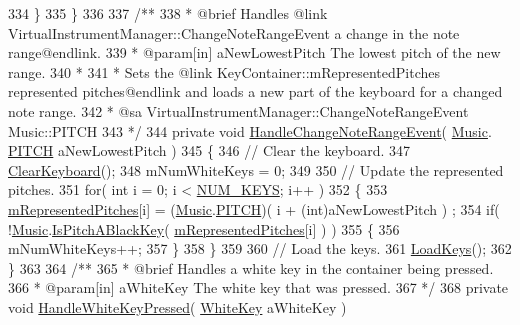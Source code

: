 \begin{DoxyCodeInclude}
334         \}
335     \}
336 \textcolor{comment}{}
337 \textcolor{comment}{    /** }
338 \textcolor{comment}{     * @brief Handles @link VirtualInstrumentManager::ChangeNoteRangeEvent a change in the note
       range@endlink.}
339 \textcolor{comment}{     * @param[in] aNewLowestPitch The lowest pitch of the new range.}
340 \textcolor{comment}{     * }
341 \textcolor{comment}{     * Sets the @link KeyContainer::mRepresentedPitches represented pitches@endlink and loads a new part of
       the keyboard for a changed note range.}
342 \textcolor{comment}{     * @sa VirtualInstrumentManager::ChangeNoteRangeEvent Music::PITCH}
343 \textcolor{comment}{    */}
344     \textcolor{keyword}{private} \textcolor{keywordtype}{void} \hyperlink{group___key_contain_handlers_ga0d82098e4f886f77a33f9d5ed13fe195}{HandleChangeNoteRangeEvent}( \hyperlink{class_music}{Music}.
      \hyperlink{group___music_enums_ga508f69b199ea518f935486c990edac1d}{PITCH} aNewLowestPitch )
345     \{
346         \textcolor{comment}{// Clear the keyboard.}
347         \hyperlink{group___key_contain_priv_func_ga679f5ca9d6b1505180e90ee00bbfe616}{ClearKeyboard}();
348         mNumWhiteKeys = 0;
349 
350         \textcolor{comment}{// Update the represented pitches.}
351         \textcolor{keywordflow}{for}( \textcolor{keywordtype}{int} i = 0; i < \hyperlink{group___key_contain_const_gaa8fe6473e6396976e52c5793f027380e}{NUM\_KEYS}; i++ )
352         \{
353             \hyperlink{group___key_contain_priv_var_ga103945a6efe3469191e5253d13fec5be}{mRepresentedPitches}[i] = (\hyperlink{class_music}{Music}.\hyperlink{group___music_enums_ga508f69b199ea518f935486c990edac1d}{PITCH})( i + (\textcolor{keywordtype}{int})aNewLowestPitch )
      ;
354             \textcolor{keywordflow}{if}( !\hyperlink{class_music}{Music}.\hyperlink{group___music_stat_func_gacc2c1a66df7197225f61c5737f794065}{IsPitchABlackKey}( 
      \hyperlink{group___key_contain_priv_var_ga103945a6efe3469191e5253d13fec5be}{mRepresentedPitches}[i] ) )
355             \{
356                 mNumWhiteKeys++;
357             \}
358         \}
359 
360         \textcolor{comment}{// Load the keys.}
361         \hyperlink{group___key_contain_priv_func_ga65f79700f265d2223681ac95981ab4a3}{LoadKeys}();
362     \}
363 \textcolor{comment}{}
364 \textcolor{comment}{    /**}
365 \textcolor{comment}{    * @brief Handles a white key in the container being pressed.}
366 \textcolor{comment}{    * @param[in] aWhiteKey The white key that was pressed.}
367 \textcolor{comment}{    */}
368     \textcolor{keyword}{private} \textcolor{keywordtype}{void} \hyperlink{group___key_contain_handlers_ga4e2c5e8be389a7514429910e7d61f028}{HandleWhiteKeyPressed}( \hyperlink{class_white_key}{WhiteKey} aWhiteKey )

\end{DoxyCodeInclude}
